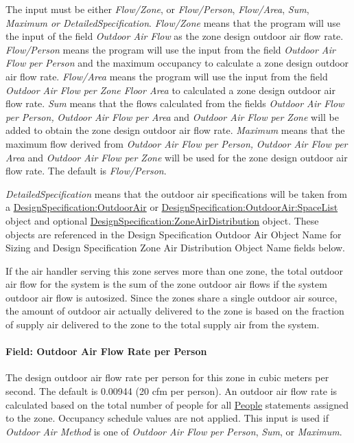 The input must be either \emph{Flow/Zone}, or \emph{Flow/Person}, \emph{Flow/Area}, \emph{Sum}, \emph{Maximum or DetailedSpecification}. \emph{Flow/Zone} means that the program will use the input of the field \emph{Outdoor Air Flow} as the zone design outdoor air flow rate. \emph{Flow/Person} means the program will use the input from the field \emph{Outdoor Air Flow per Person} and the maximum occupancy to calculate a zone design outdoor air flow rate. \emph{Flow/Area} means the program will use the input from the field \emph{Outdoor Air Flow per Zone Floor Area} to calculated a zone design outdoor air flow rate. \emph{Sum} means that the flows calculated from the fields \emph{Outdoor Air Flow per Person,} \emph{Outdoor Air Flow per Area} and \emph{Outdoor Air Flow per Zone} will be added to obtain the zone design outdoor air flow rate. \emph{Maximum} means that the maximum flow derived from \emph{Outdoor Air Flow per Person,} \emph{Outdoor Air Flow per Area} and \emph{Outdoor Air Flow per Zone} will be used for the zone design outdoor air flow rate. The default is \emph{Flow/Person}.

\emph{DetailedSpecification} means that the outdoor air specifications will be taken from a \hyperref[designspecificationoutdoorair]{DesignSpecification:OutdoorAir} or \hyperref[designspecificationoutdoorairspacelist]{DesignSpecification:OutdoorAir:SpaceList} object and optional \hyperref[designspecificationzoneairdistribution]{DesignSpecification:ZoneAirDistribution} object. These objects are referenced in the Design Specification Outdoor Air Object Name for Sizing and Design Specification Zone Air Distribution Object Name fields below.

If the air handler serving this zone serves more than one zone, the total outdoor air flow for the system is the sum of the zone outdoor air flows if the system outdoor air flow is autosized. Since the zones share a single outdoor air source, the amount of outdoor air actually delivered to the zone is based on the fraction of supply air delivered to the zone to the total supply air from the system.

\paragraph{Field: Outdoor Air Flow Rate per Person}\label{field-outdoor-air-flow-rate-per-person-8}

The design outdoor air flow rate per person for this zone in cubic meters per second. The default is 0.00944 (20 cfm per person). An outdoor air flow rate is calculated based on the total number of people for all \hyperref[people]{People} statements assigned to the zone. Occupancy schedule values are not applied. This input is used if \emph{Outdoor Air Method} is one of \emph{Outdoor Air Flow per Person}, \emph{Sum}, or \emph{Maximum}.

